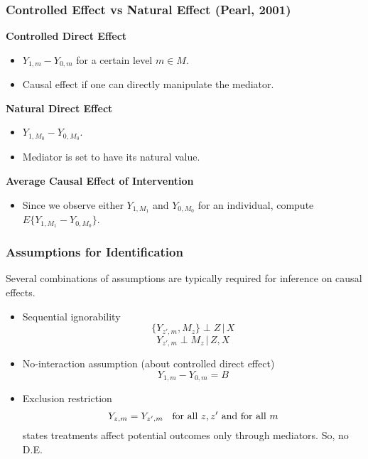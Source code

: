 \documentclass{beamer}
\begin{document}
\begin{frame}
\frametitle{Controlled Effect vs Natural Effect (Pearl, 2001)}
{\bf Controlled Direct Effect}
\begin{itemize}
\item $Y_{1,m}-Y_{0,m}$ for a certain level $m \in M$.
\item Causal effect if one can directly manipulate the mediator.
\end{itemize} 
{\bf Natural Direct Effect}
\begin{itemize}
\item $Y_{1,M_0}-Y_{0,M_0}$.
\item Mediator is set to have its natural value.
\end{itemize}
{\bf Average Causal Effect of Intervention}
\begin{itemize}
\item Since we observe either $Y_{1,M_1}$ and $Y_{0,M_0}$ for
  an individual, compute $E\{Y_{1,M_1}-Y_{0,M_0}\}$.
\end{itemize}
\end{frame}

\begin{frame}
\frametitle{Assumptions for Identification}
Several combinations of assumptions are typically required for inference on causal effects.
\begin{itemize}
\item Sequential ignorability 
\[\{Y_{z',m},M_z\} \perp Z \,| \,X\]
\[Y_{z',m} \perp M_z \,| \,Z, X\]
\item No-interaction assumption (about controlled direct effect)  
\[Y_{1,m}-Y_{0,m} = B\]
\item Exclusion restriction
\[Y_{z,m}=Y_{z',m} \hspace{2mm} \mbox{ for all } z, z' \mbox{ and for all } m\] states treatments affect potential outcomes
only through mediators. So, no D.E.
\end{itemize}
\end{frame}
\end{document}
